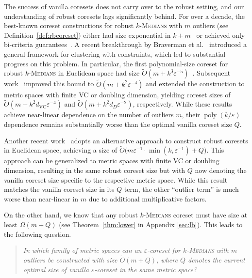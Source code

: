\documentclass[11pt,letterpaper]{article}
\newtheorem{problem}{Problem}
\theoremstyle{definition}
\newcommand{\eps}{\varepsilon}
\newcommand{\VC}{\ensuremath{\mathrm{VC}}}
\newcommand{\ProblemName}[1]{\textsc{#1}}
\newcommand{\kMedian}{\ProblemName{$k$-Medians}\xspace}
\DeclareMathOperator{\poly}{poly}
\begin{document}
The success of vanilla coresets does not carry over to the robust setting, and our understanding of robust coresets lags significantly behind.
For over a decade, the best-known coreset constructions for robust \kMedian with $m$ outliers (see Definition~\ref{def:rbcoreset}) either had size exponential in $k+m$~\cite{feldman2012data} or achieved only bi-criteria guarantees~\cite{DBLP:conf/stoc/FeldmanL11,huang2018epsilon}.
A recent breakthrough by Braverman et al.~\cite{braverman2022power} introduced a general framework for clustering with constraints, which led to substantial progress on this problem.
%
In particular, the first polynomial-size coreset for robust \kMedian in Euclidean space had size $\tilde{O}(m+k^3\eps^{-5})$~\cite{huang2022near}.
Subsequent work~\cite{huang2025coresets} improved this bound to $\tilde{O}(m+k^2\eps^{-4})$ and extended the construction to metric spaces with finite VC or doubling dimension, yielding coreset sizes of $\tilde{O}(m+k^2 d_{\VC}\eps^{-4})$ and $\tilde{O}(m+k^2 d_{D}\eps^{-2})$, respectively.
While these results achieve near-linear dependence on the number of outliers $m$, their $\poly(k/\eps)$ dependence remains substantially worse than the optimal vanilla coreset size $Q$. 

Another recent work~\cite{jiang2025coresets} adopts an alternative approach to construct robust coresets in Euclidean space, achieving a size of $\tilde{O}\big(m\eps^{-1}\cdot \min(k,\eps^{-1}) + Q\big)$.
This approach can be generalized to metric spaces with finite VC or doubling dimension, resulting in the same robust coreset size but with $Q$ now denoting the vanilla coreset size specific to the respective metric space.
While this result matches the vanilla coreset size in its $Q$ term, the other ``outlier term'' is much worse than near-linear in $m$ due to additional multiplicative factors.

On the other hand, we know that any robust \kMedian coreset must have size at least $\Omega(m+Q)$ (see Theorem~\ref{thm:lower} in Appendix \ref{sec:lb}). This leads to the following question.


\begin{quote}
\textit{%
In which family of metric spaces can an $\eps$-coreset for \kMedian with $m$ outliers be constructed with size $\tilde{O}(m+Q)$, where $Q$ denotes the current optimal size of vanilla $\eps$-coreset in the same metric space?
}
\end{quote}
\end{document}
